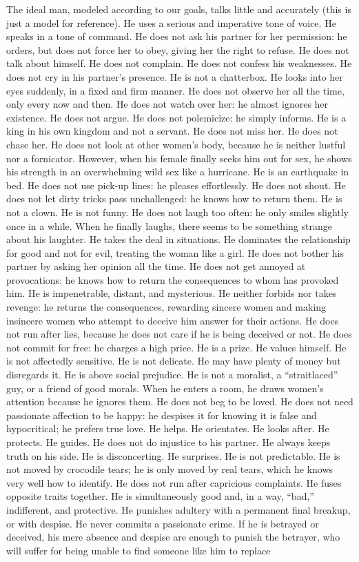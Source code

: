 \par The ideal man, modeled according to our goals, talks little and accurately (this is just a model for reference). He uses a serious and imperative tone of voice. He speaks in a tone of command. He does not ask his partner for her permission: he orders, but does not force her to obey, giving her the right to refuse. He does not talk about himself. He does not complain. He does not confess his weaknesses. He does not cry in his partner's presence. He is not a chatterbox. He looks into her eyes suddenly, in a fixed and firm manner. He does not observe her all the time, only every now and then. He does not watch over her: he almost ignores her existence. He does not argue. He does not polemicize: he simply informs. He is a king in his own kingdom and not a servant. He does not miss her. He does not chase her. He does not look at other women's body, because he is neither lustful nor a fornicator. However, when his female finally seeks him out for sex, he shows his strength in an overwhelming wild sex like a hurricane. He is an earthquake in bed. He does not use pick-up lines: he pleases effortlessly. He does not shout. He does not let dirty tricks pass unchallenged: he knows how to return them. He is not a clown. He is not funny. He does not laugh too often: he only smiles slightly once in a while. When he finally laughs, there seems to be something strange about his laughter. He takes the deal in situations. He dominates the relationship for good and not for evil, treating the woman like a girl. He does not bother his partner by asking her opinion all the time. He does not get annoyed at provocations: he knows how to return the consequences to whom has provoked him. He is impenetrable, distant, and mysterious. He neither forbids nor takes revenge: he returns the consequences, rewarding sincere women and making insincere women who attempt to deceive him answer for their actions. He does not run after lies, because he does not care if he is being deceived or not. He does not commit for free: he charges a high price. He is a prize. He values himself. He is not affectedly sensitive. He is not delicate. He may have plenty of money but disregards it. He is above social prejudice. He is not a moralist, a \enquote{straitlaced} guy, or a friend of good morals. When he enters a room, he draws women's attention because he ignores them. He does not beg to be loved. He does not need passionate affection to be happy: he despises it for knowing it is false and hypocritical; he prefers true love. He helps. He orientates. He looks after. He protects. He guides. He does not do injustice to his partner. He always keeps truth on his side. He is disconcerting. He surprises. He is not predictable. He is not moved by crocodile tears; he is only moved by real tears, which he knows very well how to identify. He does not run after capricious complaints. He fuses opposite traits together. He is simultaneously good and, in a way, \enquote{bad,} indifferent, and protective. He punishes adultery with a permanent final breakup, or with despise. He never commits a passionate crime. If he is betrayed or deceived, his mere absence and despise are enough to punish the betrayer, who will suffer for being unable to find someone like him to replace 
